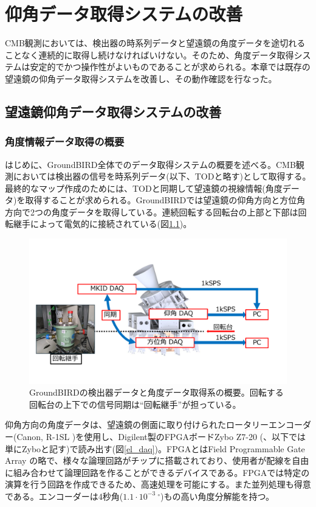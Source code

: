 \chapter{仰角データ取得システムの改善}
\label{chapter3}

CMB観測においては、検出器の時系列データと望遠鏡の角度データを途切れることなく連続的に取得し続けなければいけない。そのため、角度データ取得システムは安定的でかつ操作性がよいものであることが求められる。本章では既存の望遠鏡の仰角データ取得システムを改善し、その動作確認を行なった。
\section{望遠鏡仰角データ取得システムの改善}

\subsection{角度情報データ取得の概要}
はじめに、GroundBIRD全体でのデータ取得システムの概要を述べる。CMB観測においては検出器の信号を時系列データ(以下、TODと略す)として取得する。最終的なマップ作成のためには、TODと同期して望遠鏡の視線情報(角度データ)を取得することが求められる。GroundBIRDでは望遠鏡の仰角方向と方位角方向で2つの角度データを取得している。連続回転する回転台の上部と下部は回転継手によって電気的に接続されている(図\ref{GB_daq})。

\begin{figure}[htbp]
  \centering
  \includegraphics[width=1.0\columnwidth]{4_elDAQ/figs/GB_daq_2.pdf}
  \caption{GroundBIRDの検出器データと角度データ取得系の概要。回転する回転台の上下での信号同期は``回転継手''が担っている。}
  \label{GB_daq}
\end{figure}

仰角方向の角度データは、望遠鏡の側面に取り付けられたロータリーエンコーダー(Canon, R-1SL \cite{R-1SL})を使用し、Digilent製のFPGAボードZybo Z7-20 (\cite{Zybo}、以下では単にZyboと記す)で読み出す(図\ref{el_daq})。FPGAとはField Programmable Gate Array の略で、様々な論理回路がチップに搭載されており、使用者が配線を自由に組み合わせて論理回路を作ることができるデバイスである。FPGAでは特定の演算を行う回路を作成できるため、高速処理を可能にする。また並列処理も得意である。エンコーダーは4秒角($1.1\cdot{10^{-3}}~^{\circ}$)もの高い角度分解能を持つ。

